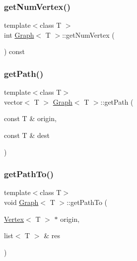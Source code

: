 \subsubsection{\texorpdfstring{get\+Num\+Vertex()}{getNumVertex()}}
{\footnotesize\ttfamily template$<$class T $>$ \\
int \hyperlink{class_graph}{Graph}$<$ T $>$\+::get\+Num\+Vertex (\begin{DoxyParamCaption}{ }\end{DoxyParamCaption}) const}

\mbox{\label{class_graph_ab4054ca572c10669dd3e05d6d41c116c}} 
\subsubsection{\texorpdfstring{get\+Path()}{getPath()}}
{\footnotesize\ttfamily template$<$class T$>$ \\
vector$<$ T $>$ \hyperlink{class_graph}{Graph}$<$ T $>$\+::get\+Path (\begin{DoxyParamCaption}\item[{const T \&}]{origin,  }\item[{const T \&}]{dest }\end{DoxyParamCaption})}

\mbox{\label{class_graph_ac08257ce8a96a8b4e44f1818e5eb8cf9}} 
\subsubsection{\texorpdfstring{get\+Path\+To()}{getPathTo()}}
{\footnotesize\ttfamily template$<$class T$>$ \\
void \hyperlink{class_graph}{Graph}$<$ T $>$\+::get\+Path\+To (\begin{DoxyParamCaption}\item[{\hyperlink{class_vertex}{Vertex}$<$ T $>$ $\ast$}]{origin,  }\item[{list$<$ T $>$ \&}]{res }\end{DoxyParamCaption})\hspace{0.3cm}{\ttfamily [private]}}

\mbox{\label{class_graph_a947115150a94f88ac9aedbcec59dd07e}} 
